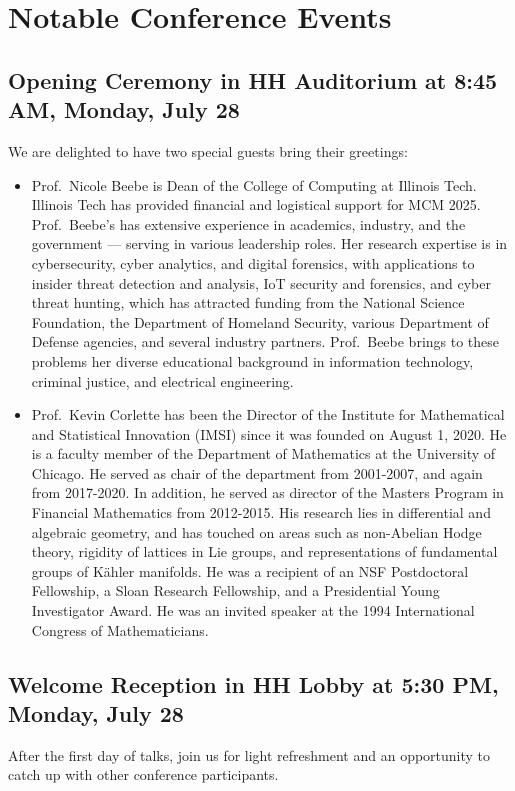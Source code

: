 \documentclass[12pt,lettersize,oneside]{book} %
\begin{document}
\section{Notable Conference Events}

\subsection{Opening Ceremony in HH Auditorium at 8:45 AM, Monday, July 28}
We are delighted to have two special guests bring their greetings:
\begin{itemize}
	\item Prof.\ Nicole Beebe is Dean of the College of Computing at Illinois Tech.  Illinois Tech has provided financial and logistical support for MCM 2025.  Prof.\ Beebe's has extensive experience in academics, industry, and the government --- serving in various leadership roles.   Her research expertise is in cybersecurity, cyber analytics, and digital forensics, with applications to insider threat detection and analysis, IoT security and forensics, and cyber threat hunting, which has attracted funding from the National Science Foundation, the
	Department of Homeland Security, various Department of Defense
	agencies, and several industry partners.  Prof.\ Beebe brings to these problems her diverse educational background in information technology, criminal justice, and electrical engineering.



	\item Prof.\ Kevin Corlette has been the Director of the Institute for Mathematical and Statistical Innovation (IMSI) since it was founded on August 1, 2020. He is a faculty member of the Department of Mathematics at the University of Chicago. He served as chair of the department from 2001-2007, and again from 2017-2020. In addition, he served as director of the Masters Program in Financial Mathematics from 2012-2015. His research lies in differential and algebraic geometry, and has touched on areas such as non-Abelian Hodge theory, rigidity of lattices in Lie groups, and representations of fundamental groups of K\"ahler manifolds. He was a recipient of an NSF Postdoctoral Fellowship, a Sloan Research Fellowship, and a Presidential Young Investigator Award. He was an invited speaker at the 1994 International Congress of Mathematicians.

\end{itemize}

\subsection{Welcome Reception in HH Lobby at 5:30 PM, Monday, July 28}
After the first day of talks, join us for light refreshment and an opportunity to catch up with other conference participants.
\end{document}
